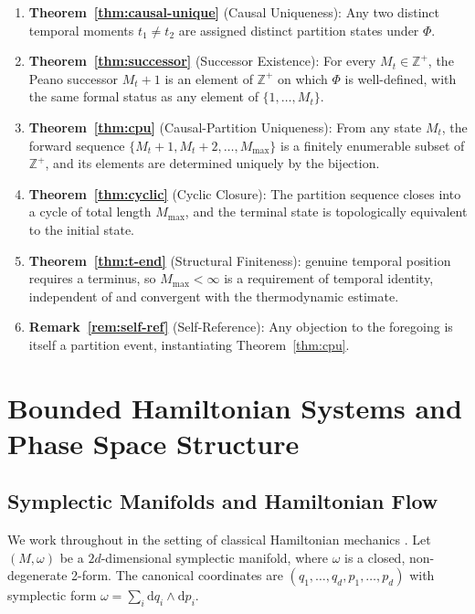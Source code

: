 \documentclass[twocolumn,10pt,a4paper]{article}
\theoremstyle{thmstyle}
\theoremstyle{definition}
\theoremstyle{remark}
\newcommand{\Zp}{\mathbb{Z}^{+}}
\newcommand{\Mmax}{M_{\max}}
\newcommand{\PhiMap}{\varPhi}
\begin{document}
\begin{enumerate}[leftmargin=1.5em,itemsep=0.2em]
\item \textbf{Theorem~\ref{thm:causal-unique}} (Causal Uniqueness): Any two distinct temporal moments $t_1 \neq t_2$ are assigned distinct partition states under $\PhiMap$.

\item \textbf{Theorem~\ref{thm:successor}} (Successor Existence): For every $M_t \in \Zp$, the Peano successor $M_t + 1$ is an element of $\Zp$ on which $\PhiMap$ is well-defined, with the same formal status as any element of $\{1, \ldots, M_t\}$.

\item \textbf{Theorem~\ref{thm:cpu}} (Causal-Partition Uniqueness): From any state $M_t$, the forward sequence $\{M_t + 1, M_t + 2, \ldots, \Mmax\}$ is a finitely enumerable subset of $\Zp$, and its elements are determined uniquely by the bijection.

\item \textbf{Theorem~\ref{thm:cyclic}} (Cyclic Closure): The partition sequence closes into a cycle of total length $\Mmax$, and the terminal state is topologically equivalent to the initial state.

\item \textbf{Theorem~\ref{thm:t-end}} (Structural Finiteness): genuine temporal position requires a terminus, so $\Mmax<\infty$ is a requirement of temporal identity, independent of and convergent with the thermodynamic estimate.

\item \textbf{Remark~\ref{rem:self-ref}} (Self-Reference): Any objection to the foregoing is itself a partition event, instantiating Theorem~\ref{thm:cpu}.
\end{enumerate}

\section{Bounded Hamiltonian Systems and Phase Space Structure}
\label{sec:bounded}

\subsection{Symplectic Manifolds and Hamiltonian Flow}

We work throughout in the setting of classical Hamiltonian mechanics \citep{hamilton1835,arnold1989,goldstein2002}. Let $(M, \omega)$ be a $2d$-dimensional symplectic manifold, where $\omega$ is a closed, non-degenerate 2-form. The canonical coordinates are $(q_1,\ldots,q_d, p_1,\ldots,p_d)$ with symplectic form $\omega = \sum_i \mathrm{d}q_i \wedge \mathrm{d}p_i$.
\end{document}
